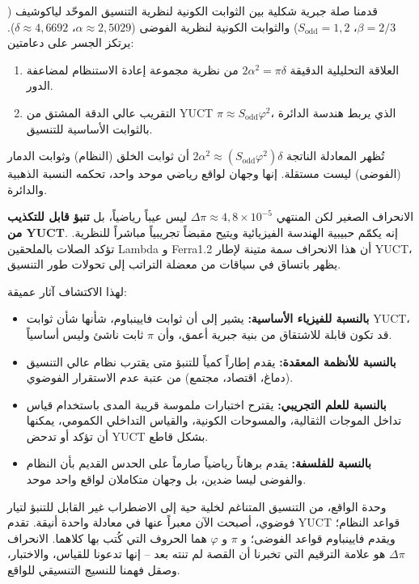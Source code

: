 \documentclass[12pt,a4paper]{article}
\begin{document}
	قدمنا صلة جبرية شكلية بين الثوابت الكونية لنظرية التنسيق الموحّد لياكوشيف (\(\beta = 2/3\)، \(S_{\mathrm{odd}} = 1{,}2\)) والثوابت الكونية لنظرية الفوضى (\(\alpha \approx 2{,}5029\)، \(\delta \approx 4{,}6692\)). يرتكز الجسر على دعامتين:
	\begin{enumerate}
		\item العلاقة التحليلية الدقيقة \(2\alpha^2 = \pi \delta\) من نظرية مجموعة إعادة الاستنظام لمضاعفة الدور.
		\item التقريب عالي الدقة المشتق من YUCT \(\pi \approx S_{\mathrm{odd}}\varphi^2\)، الذي يربط هندسة الدائرة بالثوابت الأساسية للتنسيق.
	\end{enumerate}
	
	تُظهر المعادلة الناتجة \(2\alpha^2 \approx (S_{\mathrm{odd}}\varphi^2)\delta\) أن ثوابت الخلق (النظام) وثوابت الدمار (الفوضى) ليست مستقلة. إنها وجهان لواقع رياضي موحد واحد، تحكمه النسبة الذهبية والدائرة.
	
	الانحراف الصغير لكن المنتهي \(\Delta\pi \approx 4{,}8\times10^{-5}\) ليس عيباً رياضياً، بل \textbf{تنبؤ قابل للتكذيب من YUCT}. إنه يكمّم حبيبية الهندسة الفيزيائية ويتيح مقبضاً تجريبياً مباشراً للنظرية. تؤكد الصلات بالملحقين Lambda و Ferra1.2 أن هذا الانحراف سمة متينة لإطار YUCT، يظهر باتساق في سياقات من معضلة التراتب إلى تحولات طور التنسيق.
	
	لهذا الاكتشاف آثار عميقة:
	\begin{itemize}
		\item \textbf{بالنسبة للفيزياء الأساسية:} يشير إلى أن ثوابت فايينباوم، شأنها شأن ثوابت YUCT، قد تكون قابلة للاشتقاق من بنية جبرية أعمق، وأن \(\pi\) ثابت ناشئ وليس أساسياً.
		\item \textbf{بالنسبة للأنظمة المعقدة:} يقدم إطاراً كمياً للتنبؤ متى يقترب نظام عالي التنسيق (دماغ، اقتصاد، مجتمع) من عتبة عدم الاستقرار الفوضوي.
		\item \textbf{بالنسبة للعلم التجريبي:} يقترح اختبارات ملموسة قريبة المدى باستخدام قياس تداخل الموجات الثقالية، والمسوحات الكونية، والقياس التداخلي الكمومي، يمكنها أن تؤكد أو تدحض YUCT بشكل قاطع.
		\item \textbf{بالنسبة للفلسفة:} يقدم برهاناً رياضياً صارماً على الحدس القديم بأن النظام والفوضى ليسا ضدين، بل وجهان متكاملان لواقع واحد موحد.
	\end{itemize}
	
	وحدة الواقع، من التنسيق المتناغم لخلية حية إلى الاضطراب غير القابل للتنبؤ لتيار فوضوي، أصبحت الآن معبراً عنها في معادلة واحدة أنيقة. تقدم YUCT قواعد النظام؛ ويقدم فايينباوم قواعد الفوضى؛ و \(\pi\) و \(\varphi\) هما الحروف التي كُتب بها كلاهما. الانحراف \(\Delta\pi\) هو علامة الترقيم التي تخبرنا أن القصة لم تنته بعد – إنها تدعونا للقياس، والاختبار، وصقل فهمنا للنسيج التنسيقي للواقع.
	
\end{document}
